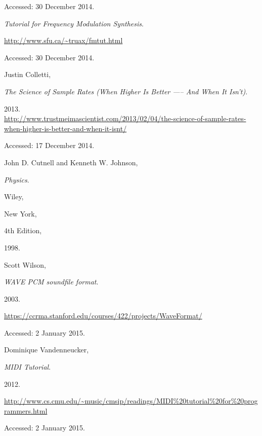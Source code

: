 \begin{thebibliography}{99}
  Accessed: 30 December 2014.


  \emph{Tutorial for Frequency Modulation Synthesis}.

  \url{http://www.sfu.ca/~truax/fmtut.html}

  Accessed: 30 December 2014.


  Justin Colletti,

  \emph{The Science of Sample Rates (When Higher Is Better —-- And When It Isn't)}.

  2013.\\
  \url{http://www.trustmeimascientist.com/2013/02/04/the-science-of-sample-rates-when-higher-is-better-and-when-it-isnt/}

  Accessed: 17 December 2014.


  John D. Cutnell and Kenneth W. Johnson,

  \emph{Physics}.

  Wiley,

  New York,

  4th Edition,

  1998.


  Scott Wilson,

  \emph{WAVE PCM soundfile format}.

  2003.

  \url{https://ccrma.stanford.edu/courses/422/projects/WaveFormat/}

  Accessed: 2 January 2015.


  Dominique Vandenneucker,

  \emph{MIDI Tutorial}.

  2012.

  \url{http://www.cs.cmu.edu/~music/cmsip/readings/MIDI%20tutorial%20for%20programmers.html}

  Accessed: 2 January 2015.

\end{thebibliography}
